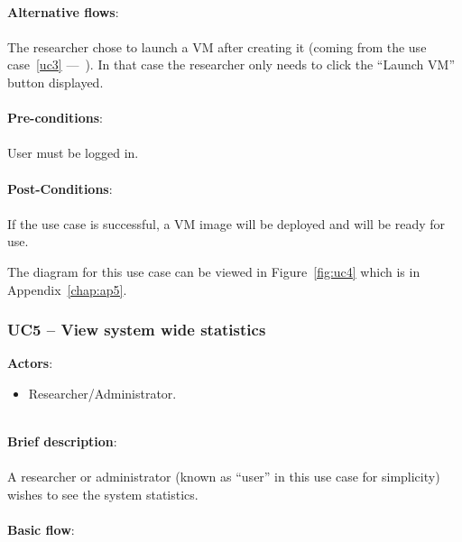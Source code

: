 \ \\
\textbf{Alternative flows}:\\
\ \\
The researcher chose to launch a VM after creating it (coming from the use case~\ref{uc3} ---~). In that case the researcher only needs to click the ``Launch VM'' button displayed.\\
\ \\
\textbf{Pre-conditions}:\\
\ \\
User must be logged in.\\
\ \\
\textbf{Post-Conditions}:\\
\ \\
If the use case is successful, a VM image will be deployed and will be ready for use.

The diagram for this use case can be viewed in Figure~\ref{fig:uc4} which is in Appendix~\ref{chap:ap5}.

\subsubsection{UC5 -- View system wide statistics}\label{uc5}

\textbf{Actors}:

\begin{itemize}
\item Researcher/Administrator.
\end{itemize}

\ \\
\textbf{Brief description}:\\
\ \\
A researcher or administrator (known as ``user'' in this use case for simplicity) wishes to see the system statistics.\\
\ \\
\textbf{Basic flow}:

